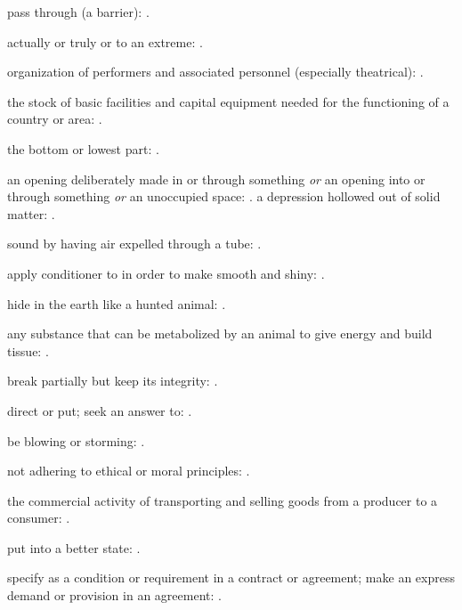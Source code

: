   pass through (a barrier):   .

  actually or truly or to an extreme: .

  organization of performers and associated personnel (especially theatrical):   .

  the stock of basic facilities and capital equipment needed for the functioning of a country or area:   .

  the bottom or lowest part: .

  an opening deliberately made in or through something \textit{or} an opening into or through something \textit{or} an unoccupied space: . a depression hollowed out of solid matter:   .

  sound by having air expelled through a tube: .

  apply conditioner to in order to make smooth and shiny: .

  hide in the earth like a hunted animal: .

  any substance that can be metabolized by an animal to give energy and build tissue:   .

  break partially but keep its integrity: .

  direct or put; seek an answer to: .

  be blowing or storming: .

  not adhering to ethical or moral principles:   .

  the commercial activity of transporting and selling goods from a producer to a consumer: .

  put into a better state: .

  specify as a condition or requirement in a contract or agreement; make an express demand or provision in an agreement:   .

